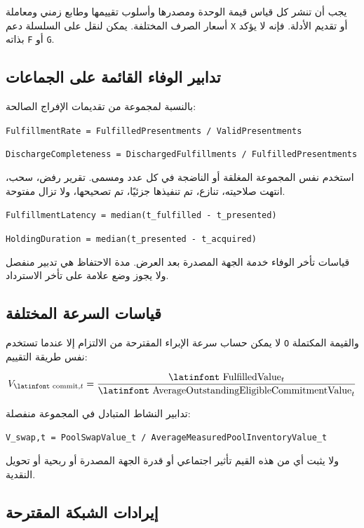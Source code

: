 \documentclass[11pt]{article}
\begin{document}
يجب أن تنشر كل قياس قيمة الوحدة ومصدرها وأسلوب تقييمها وطابع زمني ومعاملة أسعار الصرف المختلفة. يمكن لنقل على السلسلة دعم \texttt{X} أو تقديم الأدلة. فإنه لا يؤكد بذاته \texttt{F} أو \texttt{G}.

\subsection*{تدابير الوفاء القائمة على الجماعات}

بالنسبة لمجموعة من تقديمات الإفراج الصالحة:

\texttt{FulfillmentRate = FulfilledPresentments / ValidPresentments}

\texttt{DischargeCompleteness = DischargedFulfillments / FulfilledPresentments}

استخدم نفس المجموعة المغلقة أو الناضجة في كل عدد ومسمى. تقرير رفض، سحب، انتهت صلاحيته، تنازع، تم تنفيذها جزئيًا، تم تصحيحها، ولا تزال مفتوحة.

\texttt{FulfillmentLatency = median(t\_fulfilled - t\_presented)}

\texttt{HoldingDuration = median(t\_presented - t\_acquired)}

قياسات تأخر الوفاء خدمة الجهة المصدرة بعد العرض. مدة الاحتفاظ هي تدبير منفصل ولا يجوز وضع علامة على تأخر الاسترداد.

\subsection*{قياسات السرعة المختلفة}

لا يمكن حساب سرعة الإبراء المقترحة من الالتزام إلا عندما تستخدم \texttt{O} والقيمة المكتملة نفس طريقة التقييم:

\[
V_{\text{\latinfont commit},t} = \frac{\text{\latinfont FulfilledValue}_t}{\text{\latinfont AverageOutstandingEligibleCommitmentValue}_t}
\]

تدابير النشاط المتبادل في المجموعة منفصلة:

\texttt{V\_swap,t = PoolSwapValue\_t / AverageMeasuredPoolInventoryValue\_t}

ولا يثبت أي من هذه القيم تأثير اجتماعي أو قدرة الجهة المصدرة أو ربحية أو تحويل النقدية.

\subsection*{إيرادات الشبكة المقترحة}
\end{document}
